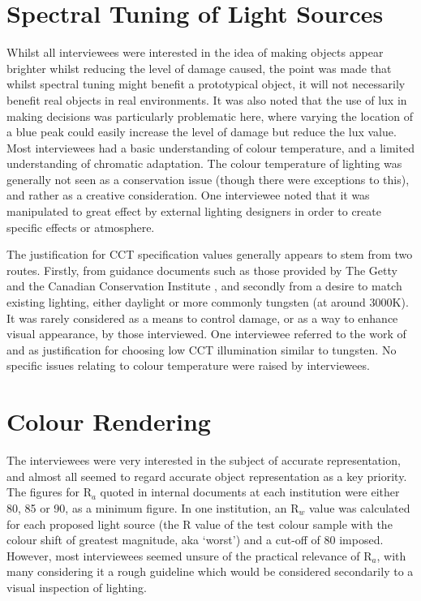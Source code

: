 \section{Spectral Tuning of Light Sources}
Whilst all interviewees were interested in the idea of making objects appear brighter whilst reducing the level of damage caused, the point was made that whilst spectral tuning might benefit a prototypical object, it will not necessarily benefit real objects in real environments. It was also noted that the use of lux in making decisions was particularly problematic here, where varying the location of a blue peak could easily increase the level of damage but reduce the lux value.
Most interviewees had a basic understanding of colour temperature, and a limited understanding of chromatic adaptation. The colour temperature of lighting was generally not seen as a conservation issue (though there were exceptions to this), and rather as a creative consideration. One interviewee noted that it was manipulated to great effect by external lighting designers in order to create specific effects or atmosphere.

The justification for \gls{CCT} specification values generally appears to stem from two routes. Firstly, from guidance documents such as those provided by The Getty and the Canadian Conservation Institute \citep{druzik_guidelines_2012}, and secondly from a desire to match existing lighting, either daylight or more commonly tungsten (at around 3000K). It was rarely considered as a means to control damage, or as a way to enhance visual appearance, by those interviewed. One interviewee referred to the work of \citet{kruithof_tubular_1941} and \citet{scuello_museum_2004,scuello_museum_2004-1} as justification for choosing low \gls{CCT} illumination similar to tungsten. No specific issues relating to colour temperature were raised by interviewees.

\section{Colour Rendering}
The interviewees were very interested in the subject of accurate representation, and almost all seemed to regard accurate object representation as a key priority. The figures for R$_a$ quoted in internal documents at each institution were either 80, 85 or 90, as a minimum figure. In one institution, an R$_w$ value was calculated for each proposed light source (the R value of the test colour sample with the colour shift of greatest magnitude, aka `worst') and a cut-off of 80 imposed. However, most interviewees seemed unsure of the practical relevance of R$_a$, with many considering it a rough guideline which would be considered secondarily to a visual inspection of lighting.

